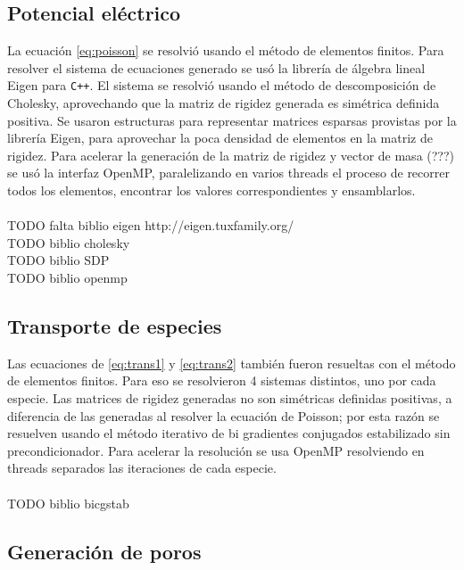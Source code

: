 \documentclass[a4paper,10pt]{article}
\begin{document}
\subsection{Potencial eléctrico}

La ecuación \ref{eq:poisson} se resolvió usando el método de elementos finitos. Para resolver el sistema de ecuaciones generado se usó la librería de álgebra lineal Eigen para \texttt{C++}. El sistema se resolvió usando el método de descomposición de Cholesky, aprovechando que la matriz de rigidez generada es simétrica definida positiva. Se usaron estructuras para representar matrices esparsas provistas por la librería Eigen, para aprovechar la poca densidad de elementos en la matriz de rigidez. Para acelerar la generación de la matriz de rigidez y vector de masa (???) se usó la interfaz OpenMP, paralelizando en varios threads el proceso de recorrer todos los elementos, encontrar los valores correspondientes y ensamblarlos.\\
\\TODO falta biblio eigen http://eigen.tuxfamily.org/
\\TODO biblio cholesky
\\TODO biblio SDP
\\TODO biblio openmp

\subsection{Transporte de especies}

Las ecuaciones de \ref{eq:trans1} y \ref{eq:trans2} también fueron resueltas con el método de elementos finitos. Para eso se resolvieron 4 sistemas distintos, uno por cada especie. Las matrices de rigidez generadas no son simétricas definidas positivas, a diferencia de las generadas al resolver la ecuación de Poisson; por esta razón se resuelven usando el método iterativo de bi gradientes conjugados estabilizado sin precondicionador. Para acelerar la resolución se usa OpenMP resolviendo en threads separados las iteraciones de cada especie.\\
\\TODO biblio bicgstab

\subsection{Generación de poros}
\end{document}
